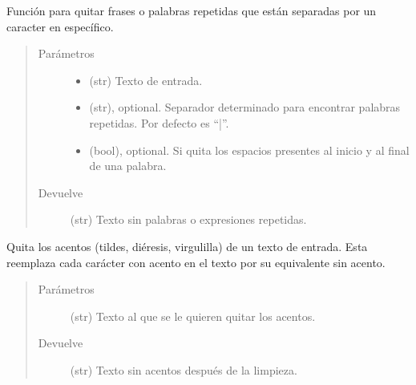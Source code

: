 \documentclass[letterpaper,10pt,openany,spanish]{sphinxmanual}
\begin{document}
\begin{fulllineitems}
\label{\detokenize{funciones/limpieza:limpieza.quitar_repetidos}}
Función para quitar frases o palabras repetidas que están separadas por un     caracter en específico.
\begin{quote}\begin{description}
\item[{Parámetros}] \leavevmode\begin{itemize}
\item {} 
 \textendash{} (str) Texto de entrada.

\item {} 
 \textendash{} (str), optional. Separador determinado para encontrar palabras repetidas.         Por defecto es “|”.

\item {} 
 \textendash{} (bool), optional. Si  quita los espacios presentes al inicio         y al final de una palabra.

\end{itemize}

\item[{Devuelve}] \leavevmode
(str) Texto sin palabras o expresiones repetidas.

\end{description}\end{quote}

\end{fulllineitems}


\begin{fulllineitems}
\label{\detokenize{funciones/limpieza:limpieza.remover_acentos}}
Quita los acentos (tildes, diéresis, virgulilla) de un texto de entrada. Esta reemplaza         cada carácter con acento en el texto por su equivalente sin acento.
\begin{quote}\begin{description}
\item[{Parámetros}] \leavevmode
{} \textendash{} (str) Texto al que se le quieren quitar los acentos.

\item[{Devuelve}] \leavevmode
(str) Texto sin acentos después de la limpieza.

\end{description}\end{quote}

\end{fulllineitems}
\end{document}
